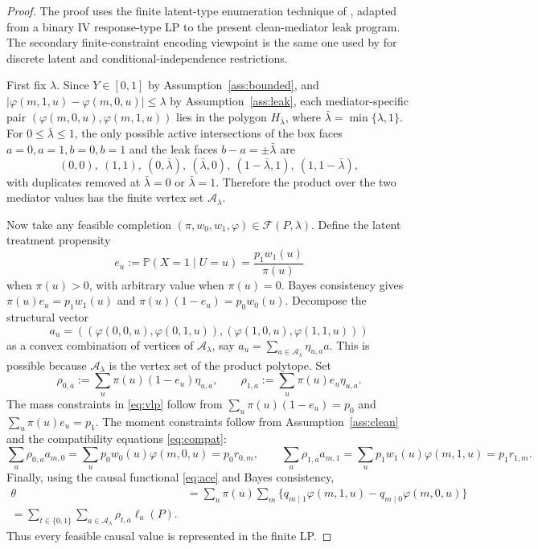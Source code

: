 \documentclass[11pt]{article}
\renewcommand{\Pr}{\mathbb{P}}
\theoremstyle{definition}
\theoremstyle{plain}
\theoremstyle{remark}
\begin{document}
\begin{proof}
The proof uses the finite latent-type enumeration technique of \citet{BalkePearl1997Bounds}, adapted from a binary IV response-type LP to the present clean-mediator leak program. The secondary finite-constraint encoding viewpoint is the same one used by \citet{FinkelsteinAdamsSariaShpitser2020MeasurementError} for discrete latent and conditional-independence restrictions.

First fix \(\lambda\). Since \(Y\in[0,1]\) by Assumption~\ref{ass:bounded}, and \(|\varphi(m,1,u)-\varphi(m,0,u)|\le\lambda\) by Assumption~\ref{ass:leak}, each mediator-specific pair \((\varphi(m,0,u),\varphi(m,1,u))\) lies in the polygon \(H_{\bar\lambda}\), where \(\bar\lambda=\min\{\lambda,1\}\). For \(0\le\bar\lambda\le1\), the only possible active intersections of the box faces \(a=0,a=1,b=0,b=1\) and the leak faces \(b-a=\pm\bar\lambda\) are
\[
  (0,0),\ (1,1),\ (0,\bar\lambda),\ (\bar\lambda,0),\ (1-\bar\lambda,1),\ (1,1-\bar\lambda),
\]
with duplicates removed at \(\bar\lambda=0\) or \(\bar\lambda=1\). Therefore the product over the two mediator values has the finite vertex set \(\mathcal A_\lambda\).

Now take any feasible completion
\((\pi,w_0,w_1,\varphi)\in\mathcal F(P,\lambda)\). Define the latent treatment propensity
\[
  e_u:=\Pr(X=1\mid U=u)=\frac{p_1w_1(u)}{\pi(u)}
\]
when \(\pi(u)>0\), with arbitrary value when \(\pi(u)=0\). Bayes consistency gives
\(\pi(u)e_u=p_1w_1(u)\) and \(\pi(u)(1-e_u)=p_0w_0(u)\). Decompose the structural vector
\[
  a_u=((\varphi(0,0,u),\varphi(0,1,u)),(\varphi(1,0,u),\varphi(1,1,u)))
\]
as a convex combination of vertices of \(\mathcal A_\lambda\), say
\(a_u=\sum_{a\in\mathcal A_\lambda}\eta_{u,a}a\). This is possible because
\(\mathcal A_\lambda\) is the vertex set of the product polytope. Set
\[
  \rho_{0,a}:=\sum_u\pi(u)(1-e_u)\eta_{u,a},\qquad
  \rho_{1,a}:=\sum_u\pi(u)e_u\eta_{u,a}.
\]
The mass constraints in \eqref{eq:vlp} follow from
\(\sum_u\pi(u)(1-e_u)=p_0\) and \(\sum_u\pi(u)e_u=p_1\). The moment constraints follow from
Assumption~\ref{ass:clean} and the compatibility equations \eqref{eq:compat}:
\[
  \sum_a\rho_{0,a}a_{m,0}
  =\sum_u p_0w_0(u)\varphi(m,0,u)=p_0r_{0,m},
  \qquad
  \sum_a\rho_{1,a}a_{m,1}
  =\sum_u p_1w_1(u)\varphi(m,1,u)=p_1r_{1,m}.
\]
Finally, using the causal functional \eqref{eq:ace} and Bayes consistency,
\[
\begin{aligned}
  \theta
  &=\sum_u\pi(u)\sum_m\{q_{m\mid1}\varphi(m,1,u)-q_{m\mid0}\varphi(m,0,u)\}\\
  =\sum_{t\in\{0,1\}}\sum_{a\in\mathcal A_\lambda}\rho_{t,a}\ell_a(P).
\end{aligned}
\]
Thus every feasible causal value is represented in the finite LP.


\end{proof}
\end{document}
